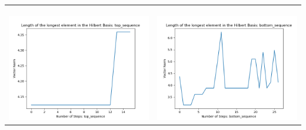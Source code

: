 \documentclass[10pt]{article}
\begin{document}
\begin{tabular}{c|c}
\begin{minipage}{.45\textwidth}
\end{minipage} \\ \\
\hline \\\begin{minipage}{.45\textwidth}
\includegraphics[width=\textwidth]{"DATA/4d/5 generators 2 bound I/top_sequence LENGTH"}
\end{minipage} &
\begin{minipage}{.45\textwidth}
\includegraphics[width=\textwidth]{"DATA/4d/5 generators 2 bound I bottomup/bottom_sequence LENGTH"}
\end{minipage}
\end{tabular}
\end{document}
